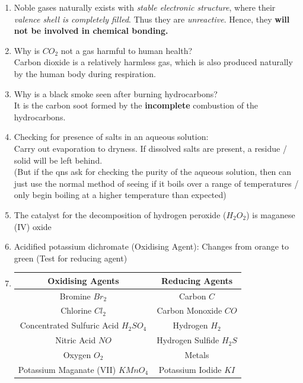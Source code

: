 \documentclass[oneside]{book}
\begin{document}
\begin{enumerate}
    \item Noble gases naturally exists with \emph{stable electronic structure}, where their \emph{valence shell is completely filled}. Thus they are \emph{unreactive}. Hence, they \textbf{will not be involved in chemical bonding.}
    \item Why is \( CO_2 \) not a gas harmful to human health?\\
    Carbon dioxide is a relatively harmless gas, which is also produced naturally by the human body during respiration.
    \item Why is a black smoke seen after burning hydrocarbons?\\
    \footnotesize It is the carbon soot formed by the \textbf{incomplete} combustion of the hydrocarbons. \normalsize
    \item Checking for presence of salts in an aqueous solution:\\
    Carry out evaporation to dryness. If dissolved salts are present, a residue / solid will be left behind.\\
    \footnotesize (But if the qns ask for checking the purity of the aqueous solution, then can just use the normal method of seeing if it boils over a range of temperatures / only begin boiling at a higher temperature than expected) \normalsize 
    \item The catalyst for the decomposition of hydrogen peroxide (\(H_2O_2\)) is maganese (IV) oxide
    \item Acidified potassium dichromate (Oxidising Agent): Changes from orange to green (Test for reducing agent) \small
    \item \begin{center}
        \begin{tabular}{ |c|c| }  
            \hline
            \color{blue} Oxidising Agents & \color{blue} Reducing Agents\\
            \hline
            Bromine \(Br_2\) & Carbon \(C\)\\
            \hline
            Chlorine \(Cl_2\) & Carbon Monoxide \(CO\)\\
            \hline
            Concentrated Sulfuric Acid \(H_2SO_4\) & Hydrogen \(H_2\)\\
            \hline
            Nitric Acid \(NO\) & Hydrogen Sulfide \(H_2S\)\\
            \hline
            Oxygen \(O_2\) & Metals\\
            \hline
            Potassium Maganate (VII) \(KMnO_4\) & Potassium Iodide \(KI\)\\

\end{tabular}
\end{center}
\end{enumerate}
\end{document}
